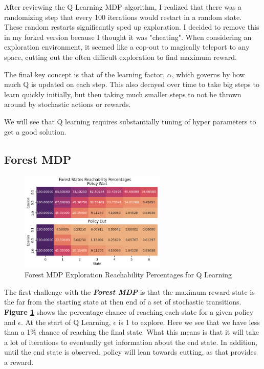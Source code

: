 \documentclass[letterpaper]{article} %
\begin{document}
After reviewing the Q Learning MDP algorithm, I realized that there was a randomizing step that every 100 iterations would restart in a random state. These random restarts significantly sped up exploration. I decided to remove this in my forked version because I thought it was "cheating".  When considering an exploration environment, it seemed like a cop-out to magically teleport to any space, cutting out the often difficult exploration to find maximum reward.  

The final key concept is that of the learning factor, \textbf{$\alpha$}, which governs by how much Q is updated on each step. This also decayed over time to take big steps to learn quickly initially, but then taking much smaller steps to not be thrown around by stochastic actions or rewards. 

We will see that Q learning requires substantially tuning of hyper parameters to get a good solution.

\subsection{Forest MDP} 

\begin{figure}[!htb]
\centering
\includegraphics[width=2.75in]{Figures/Forest_States_Reachability_Percentages.png}
\caption{Forest MDP Exploration Reachability Percentages for Q Learning}
\label{fig:forest_q_reachability}
\end{figure}
The first challenge with the \textbf{\emph{Forest MDP}} is that the maximum reward state is the far from the starting state at then end of a set of stochastic transitions.   \textbf{Figure \ref{fig:forest_q_reachability}} shows the percentage chance of reaching each state for a given policy and $\epsilon$.  At the start of Q Learning, $\epsilon$ is 1 to explore.  Here we see that we have less than a 1\% chance of reaching the final state.  What this means is that it will take a lot of iterations to eventually get information about the end state.  In addition, until the end state is observed, policy will lean towards cutting, as that provides a reward.  
\end{document}
